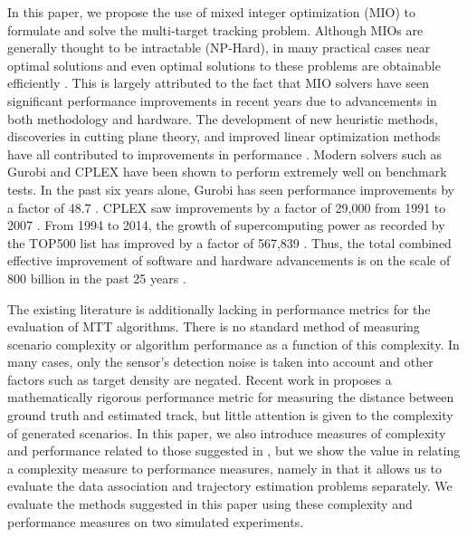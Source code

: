 In this paper, we propose the use of mixed integer optimization (MIO) to formulate and solve the multi-target tracking problem. Although MIOs are generally thought to be intractable (NP-Hard), in many practical cases near optimal solutions and even optimal solutions to these problems are obtainable efficiently \cite{Computation}. This is largely attributed to the fact that MIO solvers have seen significant performance improvements in recent years due to advancements in both methodology and hardware. The development of new heuristic methods, discoveries in cutting plane theory, and improved linear optimization methods have all contributed to improvements in performance \cite{Gurobi-MIP}. Modern solvers such as Gurobi and CPLEX have been shown to perform extremely well on benchmark tests. In the past six years alone, Gurobi has seen performance improvements by a factor of 48.7 \cite{Gurobi-Benchmark}. CPLEX saw improvements by a factor of 29,000 from 1991 to 2007 \cite{CPLEX-Benchmark}. From 1994 to 2014, the growth of supercomputing power as recorded by the TOP500 list has improved by a factor of 567,839 \cite{Supercomputer}. Thus, the total combined effective improvement of software and hardware advancements is on the scale of 800 billion in the past 25 years \cite{Dunn}. 

The existing literature is additionally lacking in performance metrics for the evaluation of MTT algorithms. There is no standard method of measuring scenario complexity or algorithm performance as a function of this complexity. In many cases, only the sensor's detection noise is taken into account and other factors such as target density are negated. Recent work in \cite{MTT-Performance} proposes a mathematically rigorous performance metric for measuring the distance between ground truth and estimated track, but little attention is given to the complexity of generated scenarios. In this paper, we also introduce measures of complexity and performance related to those suggested in \cite{MTT-Performance}, but we show the value in relating a complexity measure to performance measures, namely in that it allows us to evaluate the data association and trajectory estimation problems separately. We evaluate the methods suggested in this paper using these complexity and performance measures on two simulated experiments.

